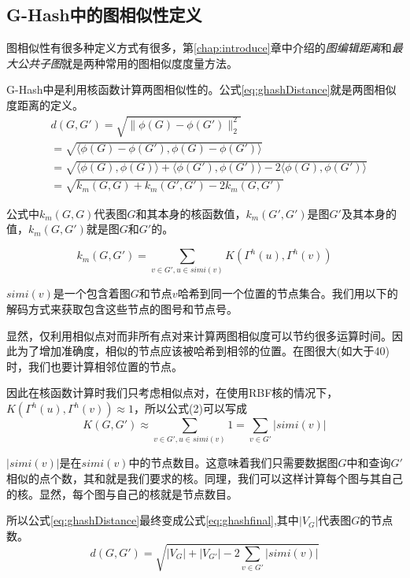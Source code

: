 \documentclass{XDBAthesis}
\begin{document}
\subsection{G-Hash中的图相似性定义}
图相似性有很多种定义方式有很多，第\ref{chap:introduce}章中介绍的\emph{图编辑距离}和\emph{最大公共子图}就是两种常用的图相似度度量方法。

G-Hash中是利用核函数计算两图相似性的。公式\ref{eq:ghashDistance}就是两图相似度距离的定义。
\begin{equation}
\begin{split}
    &d(G,G')=\sqrt{\|\phi(G)-\phi(G')\|_{2}^{2}}\\
              &=\sqrt{\langle\phi(G)-\phi(G'),\phi(G)-\phi(G')\rangle}\\
              &=\sqrt{\langle\phi(G),\phi(G)\rangle+\langle\phi(G'),\phi(G')\rangle-2\langle\phi(G),\phi(G')\rangle}\\
              &=\sqrt{k_{m}(G,G)+k_{m}(G',G')-2k_{m}(G,G')}
\end{split}
\label{eq:ghashDistance}
\end{equation}

公式中$k_{m}(G,G)$代表图$G$和其本身的核函数值，$k_{m}(G',G')$是图$G'$及其本身的值，$k_{m}(G,G')$就是图$G$和$G'$的。

\begin{equation}
k_{m}(G,G')=\sum_{v\in G',u\in simi(v)}K(\Gamma^{h}(u),\Gamma^{h}(v))
\end{equation}

$simi(v)$是一个包含着图$G$和节点$v$哈希到同一个位置的节点集合。我们用以下的解码方式来获取包含这些节点的图号和节点号。

显然，仅利用相似点对而非所有点对来计算两图相似度可以节约很多运算时间。因此为了增加准确度，相似的节点应该被哈希到相邻的位置。在图很大(如大于40)时，我们也要计算相邻位置的节点。

因此在核函数计算时我们只考虑相似点对，在使用RBF核的情况下，$K(\Gamma^{h}(u),\Gamma^{h}(v))\approx1$，所以公式(2)可以写成
\begin{equation}
    K(G,G')\approx\sum_{v\in G',u\in simi(v)}1=\sum_{v\in G'}|simi(v)| 
\end{equation}

$|simi(v)|$是在$simi(v)$中的节点数目。这意味着我们只需要数据图$G$中和查询$G'$相似的点个数，其和就是我们要求的核。同理，我们可以这样计算每个图与其自己的核。显然，每个图与自己的核就是节点数目。

所以公式\ref{eq:ghashDistance}最终变成公式\ref{eq:ghashfinal},其中$|V_{G}|$代表图$G$的节点数。
\begin{equation}
    d(G,G')=\sqrt{|V_{G}|+|V_{G'}| -2\sum_{v\in G'}|simi(v)| }
    \label{eq:ghashfinal}
\end{equation}
\end{document}

